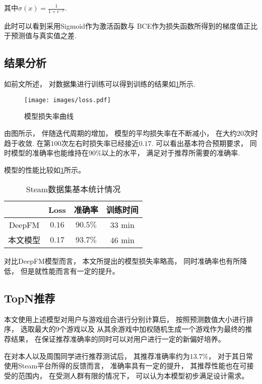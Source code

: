其中$ \sigma(x)=\frac{1}{1+e^{-x}} $.

此时可以看到采用Sigmoid作为激活函数与
BCE作为损失函数所得到的梯度值正比于预测值与真实值之差.

\subsection{结果分析}

如前文所述，
对数据集进行训练可以得到训练的结果如\cref{fig:loss}所示.

\begin{figure}[!htbp]
  \centering
  \texttt{[image: images/loss.pdf]}
  \caption{模型损失率曲线}\label{fig:loss}
\end{figure}

由图所示，
伴随迭代周期的增加，
模型的平均损失率在不断减小，
在大约$20$次时趋于收敛.
在第$100$次左右时损失率已经接近$0.17$.
可以看出基本符合预期要求，
同时模型的准确率也能维持在90\%以上的水平，
满足对于推荐所需要的准确率.

模型的性能比较如\cref{tb:comp}所示。

\begin{table}[!htbp]
  \begin{center}
    \caption{Steam数据集基本统计情况}\label{tb:comp}
    \begin{tabular}{cccc}
      \toprule
             & Loss   & 准确率 & 训练时间     \\
      \midrule
      DeepFM & $0.16$ & $90.5\%$  & $33$ min \\
      本文模型   & $0.17$ & $93.7\%$  & $46$ min    \\
      \bottomrule
    \end{tabular}
  \end{center}
\end{table}

对比DeepFM模型而言，
本文所提出的模型损失率略高，
同时准确率也有所降低，
但是就性能而言有一定的提升。

\subsection{TopN推荐}

本文使用上述模型对用户与游戏组合进行分别计算后，
按照预测数值大小进行排序，
选取最大的$9$个游戏以及
从其余游戏中加权随机生成一个游戏作为最终的推荐结果，
在保证推荐准确率的同时可以对用户进行一定的新偏好培养。

在对本人以及周围同学进行推荐测试后，
其推荐准确率约为$13.7$\%，
对于其日常使用Steam平台所得的反馈而言，
准确率具有一定的提升，
其推荐性能也在可接受的范围内，
在受测人群有限的情况下，
可以认为本模型初步满足设计需求。
